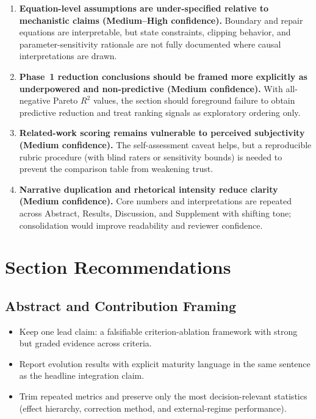 \documentclass[11pt]{article}
\begin{document}
\begin{enumerate}
  \item \textbf{Equation-level assumptions are under-specified relative to mechanistic claims (Medium--High confidence).} Boundary and repair equations are interpretable, but state constraints, clipping behavior, and parameter-sensitivity rationale are not fully documented where causal interpretations are drawn.

  \item \textbf{Phase~1 reduction conclusions should be framed more explicitly as underpowered and non-predictive (Medium confidence).} With all-negative Pareto $R^2$ values, the section should foreground failure to obtain predictive reduction and treat ranking signals as exploratory ordering only.

  \item \textbf{Related-work scoring remains vulnerable to perceived subjectivity (Medium confidence).} The self-assessment caveat helps, but a reproducible rubric procedure (with blind raters or sensitivity bounds) is needed to prevent the comparison table from weakening trust.

  \item \textbf{Narrative duplication and rhetorical intensity reduce clarity (Medium confidence).} Core numbers and interpretations are repeated across Abstract, Results, Discussion, and Supplement with shifting tone; consolidation would improve readability and reviewer confidence.
\end{enumerate}

\section*{Section Recommendations}

\subsection*{Abstract and Contribution Framing}
\begin{itemize}
  \item Keep one lead claim: a falsifiable criterion-ablation framework with strong but graded evidence across criteria.
  \item Report evolution results with explicit maturity language in the same sentence as the headline integration claim.
  \item Trim repeated metrics and preserve only the most decision-relevant statistics (effect hierarchy, correction method, and external-regime performance).
\end{itemize}
\end{document}
